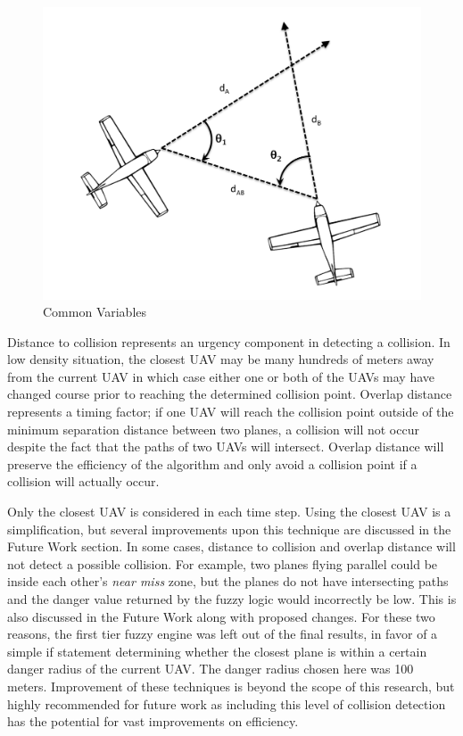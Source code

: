 \documentclass[10pt, conference, compsocconf]{IEEEtran}
\begin{document}
\begin{figure}[h]
\centering
\includegraphics[scale=0.3]{EPS/commonVariables}
\caption{Common Variables}
\label{fig:basicPic}
\end{figure}

Distance to collision represents an urgency component in detecting a collision.  In low density situation, the closest UAV may be many hundreds of meters away from the current UAV in which case either one or both of the UAVs may have changed course prior to reaching the determined collision point.  Overlap distance represents a timing factor; if one UAV will reach the collision point outside of the minimum separation distance between two planes, a collision will not occur despite the fact that the paths of two UAVs will intersect.  Overlap distance will preserve the efficiency of the algorithm and only avoid a collision point if a collision will actually occur. 

Only the closest UAV is considered in each time step. Using the closest UAV is a simplification, but several improvements upon this technique are discussed in the Future Work section. In some cases, distance to collision and overlap distance will not detect a possible collision. For example, two planes flying parallel could be inside each other's {\it near miss} zone, but the planes do not have intersecting paths and the danger value returned by the fuzzy logic would incorrectly be low. This is also discussed in the Future Work along with proposed changes. For these two reasons, the first tier fuzzy engine was left out of the final results, in favor of a simple if statement determining whether the closest plane is within a certain danger radius of the current UAV. The danger radius chosen here was 100 meters. Improvement of these techniques is beyond the scope of this research, but highly recommended for future work as including this level of collision detection has the potential for vast improvements on efficiency.
\end{document}
